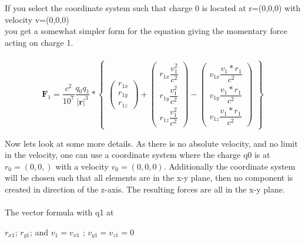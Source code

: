 \documentclass[10pt,titlepage]{article}
\begin{document}
\\
\\
If you select the coordinate system such that charge 0 is located at r=(0,0,0) with velocity v=(0,0,0)\\
you get a somewhat simpler form for the equation giving the momentary force acting on \linebreak charge 1.
\\
\\
\begin{equation}
\textbf{$\textbf{F}_1$}=\frac{c^2}{10^7}\dfrac{q_0q_1}{\vert\textbf{r}\vert^3}*
\begin{Bmatrix}
\begin{pmatrix}r_{1x} \\ r_{1y}\\r_{1z}\end{pmatrix}+
\begin{pmatrix}r_{1x}\dfrac{v_1^2}{c^2} \\	r_{1y}\dfrac{v_1^2}{c^2} \\r_{1z}\dfrac{v_1^2}{c^2}\end{pmatrix}-
\begin{pmatrix}v_{1x}\dfrac{v_1*r_1}{c^2} \\	v_{1y}\dfrac{v_1*r_1}{c^2} \\v_{1z}\dfrac{v_1*r_1}{c^2}\end{pmatrix}
\end{Bmatrix}
\end{equation}


Now lets look at some more details.
As there is no absolute velocity, and no limit in the velocity, one can use a coordinate system where the charge q0 is at $r_0=(0,0,)$ with a velocity $v_0 = (0,0,0)$.
Additionally the coordinate system will be chosen such that all elements are in the x-y plane, then no component is created in direction of the z-axis. The resulting forces are all in the x-y plane.
\\
\\
The vector formula with q1 at 

$r_{x1}$; $r_{y1}$; and  $v_{1} = v_{x1}$ ; $v_{y1}=v_{z1}=0$
\end{document}
